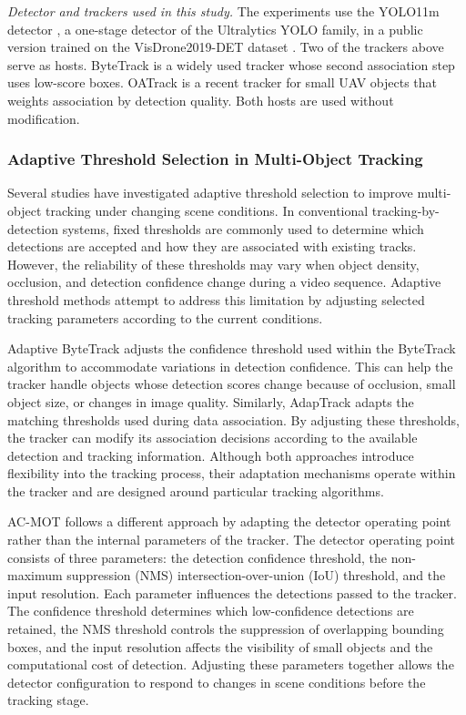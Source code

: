 \documentclass[pdflatex,sn-mathphys-num,iicol]{sn-jnl}
\begin{document}
\emph{Detector and trackers used in this study.} The experiments use the YOLO11m detector \cite{jocher2024yolo11}, a
one-stage detector of the Ultralytics YOLO family, in a public version trained
on the VisDrone2019-DET dataset \cite{zhu2022visdrone}. Two of the trackers
above serve as hosts. ByteTrack \cite{zhang2022bytetrack} is a widely used
tracker whose second association step uses low-score boxes. OATrack
\cite{qi2026oatrack} is a recent tracker for small UAV objects that weights
association by detection quality. Both hosts are used without modification.

\subsubsection{Adaptive Threshold Selection in Multi-Object Tracking}
Several studies have investigated adaptive threshold selection to improve multi-object tracking under changing scene conditions. In conventional tracking-by-detection systems, fixed thresholds are commonly used to determine which detections are accepted and how they are associated with existing tracks. However, the reliability of these thresholds may vary when object density, occlusion, and detection confidence change during a video sequence. Adaptive threshold methods attempt to address this limitation by adjusting selected tracking parameters according to the current conditions.

Adaptive ByteTrack adjusts the confidence threshold used within the ByteTrack \cite{ma2023adaptivebytetrack} algorithm to accommodate variations in detection confidence. This can help the tracker handle objects whose detection scores change because of occlusion, small object size, or changes in image quality. Similarly, AdapTrack \cite{shim2024adaptrack} adapts the matching thresholds used during data association. By adjusting these thresholds, the tracker can modify its association decisions according to the available detection and tracking information. Although both approaches introduce flexibility into the tracking process, their adaptation mechanisms operate within the tracker and are designed around particular tracking algorithms.

AC-MOT follows a different approach by adapting the detector operating point rather than the internal parameters of the tracker. The detector operating point consists of three parameters: the detection confidence threshold, the non-maximum suppression (NMS) intersection-over-union (IoU) threshold, and the input resolution. Each parameter influences the detections passed to the tracker. The confidence threshold determines which low-confidence detections are retained, the NMS threshold controls the suppression of overlapping bounding boxes, and the input resolution affects the visibility of small objects and the computational cost of detection. Adjusting these parameters together allows the detector configuration to respond to changes in scene conditions before the tracking stage.
\end{document}
